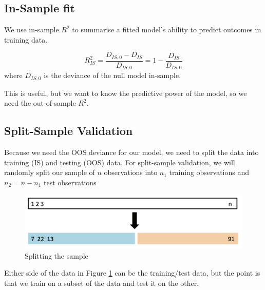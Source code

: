\documentclass[11pt]{article}
\begin{document}
\subsection{In-Sample fit}

We use in-sample $R^2$ to summarise a fitted model's ability to predict outcomes in training data.

\begin{equation*}
    R^2_{IS} = \dfrac{D_{IS,0} - D_{IS}}{D_{IS,0}} = 1 - \dfrac{D_{IS}}{D_{IS,0}}
\end{equation*}
where $D_{IS,0}$ is the deviance of the null model in-sample.

\begin{note}
    This is useful, but we want to know the predictive power of the model, so we need the out-of-sample $R^2$.
\end{note}

\subsection{Split-Sample Validation}

Because we need the OOS deviance for our model, we need to split the data into training (IS) and testing (OOS) data. For split-sample validation, we will randomly split our sample of $n$ observations into $n_1$ training observations and $n_2 = n-n_1$ test observations

\begin{figure}[h]
    \centering
    \includegraphics[width=\textwidth]{pic/split sample.png}
    \caption{Splitting the sample}
    \label{fig:split sample}
\end{figure}

Either side of the data in Figure \ref{fig:split sample} can be the training/test data, but the point is that we train on a subset of the data and test it on the other.
\end{document}
